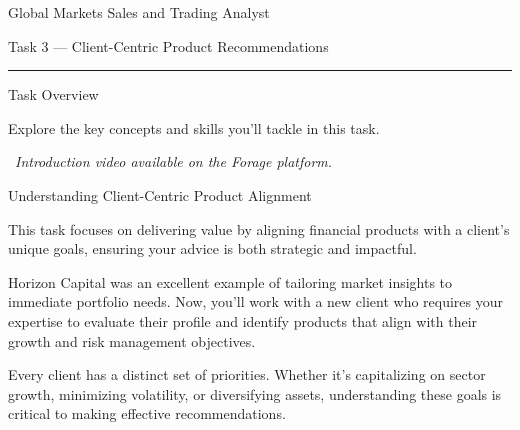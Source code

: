 \documentclass[11pt]{article}
\begin{document}
{\LARGE Global Markets Sales and Trading Analyst}\par\medskip
{\large Task 3 --- Client-Centric Product Recommendations}\par
{\color{rulegray}\rule{\linewidth}{0.6pt}}\par\bigskip

{\fontsize{26}{30}\selectfont Task Overview}\par\bigskip



Explore the key concepts and skills you'll tackle in this task.\par\medskip
{\color{gray}\faPlayCircle\ \textit{Introduction video available on the Forage
platform.}}

\newpage
{\fontsize{26}{30}\selectfont Understanding Client-Centric Product Alignment}\par\bigskip

This task focuses on delivering value by aligning financial products with a
client's unique goals, ensuring your advice is both strategic and impactful.

Horizon Capital was an excellent example of tailoring market insights to
immediate portfolio needs. Now, you'll work with a new client who requires
your expertise to evaluate their profile and identify products that align with
their growth and risk management objectives.


Every client has a distinct set of priorities. Whether it's capitalizing on
sector growth, minimizing volatility, or diversifying assets, understanding
these goals is critical to making effective recommendations.
\end{document}
